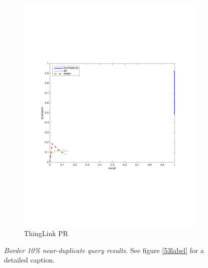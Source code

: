 \documentclass[english,12pt,a4paper,pdftex,elec,utf8, table]{aaltothesis}
\begin{document}
\begin{figure}[htb]
\begin{center}
\begin{subfigure}[b]{0.49\textwidth}
    \includegraphics[width=\textwidth]{figures/thinglink_Border10PR.pdf}
    \caption{ThingLink PR}
    \label{Borderprthinglink}
  \end{subfigure}
  \caption{\emph{Border 10\% near-duplicate query results.} See figure \ref{53label} for a detailed caption. \label{borderlabel}}
  \end{center}
\end{figure}
\end{document}
